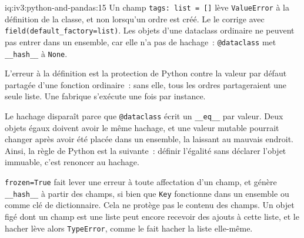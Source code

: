 \begin{solution}{iq:iv3:python-and-pandas:15}
Un champ \texttt{tags: list = []} lève \texttt{ValueError} à la définition de la classe, et non lorsqu'un ordre est créé. Le  le corrige avec \texttt{field(default\_factory=list)}. Les objets d'une dataclass ordinaire ne peuvent pas entrer dans un ensemble, car elle n'a pas de hachage~: \texttt{@dataclass} met \texttt{\_\_hash\_\_} à \texttt{None}.
\label{lst:iv3:pp:dataclass}

L'erreur à la définition est la protection de Python contre la valeur par défaut partagée d'une fonction ordinaire~: sans elle, tous les ordres partageraient une seule liste. Une fabrique s'exécute une fois par instance.

Le hachage disparaît parce que \texttt{@dataclass} écrit un \texttt{\_\_eq\_\_} par valeur. Deux objets égaux doivent avoir le même hachage, et une valeur mutable pourrait changer après avoir été placée dans un ensemble, la laissant au mauvais endroit. Ainsi, la règle de Python est la suivante~: définir l'égalité sans déclarer l'objet immuable, c'est renoncer au hachage.

\texttt{frozen=True} fait lever une erreur à toute affectation d'un champ, et génère \texttt{\_\_hash\_\_} à partir des champs, si bien que \texttt{Key} fonctionne dans un ensemble ou comme clé de dictionnaire. Cela ne protège pas le contenu des champs. Un objet figé dont un champ est une liste peut encore recevoir des ajouts à cette liste, et le hacher lève alors \texttt{TypeError}, comme le fait hacher la liste elle-même.

\end{solution}

